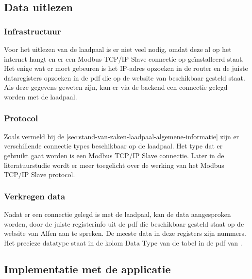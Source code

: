 \subsection{Data uitlezen}
\label{sec:stand-van-zaken-laadpaal-data-uitlezen}

\subsubsection{Infrastructuur}
\label{sec:stand-van-zaken-laadpaal-infrastructuur}

Voor het uitlezen van de laadpaal is er niet veel nodig, omdat deze al op het internet hangt en er een Modbus TCP/IP Slave connectie op geïnstalleerd staat. Het enige wat er moet gebeuren is het IP-adres opzoeken in de router en de juiste dataregisters opzoeken in de pdf die op de website van \textcite{Alfen2020} beschikbaar gesteld staat. Als deze gegevens geweten zijn, kan er via de backend een connectie gelegd worden met de laadpaal.

\subsubsection{Protocol}
\label{sec:stand-van-zaken-laadpaal-protocol}

Zoals vermeld bij de \ref{sec:stand-van-zaken-laadpaal-algemene-informatie} zijn er verschillende connectie types beschikbaar op de laadpaal. Het type dat er gebruikt gaat worden is een Modbus TCP/IP Slave connectie. Later in de literatuurstudie wordt er meer toegelicht over de werking van het Modbus TCP/IP Slave protocol.

\subsubsection{Verkregen data}
\label{sec:stand-van-zaken-laadpaal-verkregen-data}

Nadat er een connectie gelegd is met de laadpaal, kan de data aangesproken worden, door de juiste registerinfo uit de pdf die beschikbaar gesteld staat op de website van Alfen aan te spreken. De meeste data in deze registers zijn nummers. Het precieze datatype staat in de kolom Data Type van de tabel in de pdf van \textcite{Alfen2020}.

\subsection{Implementatie met de applicatie}
\label{sec:stand-van-zaken-laadpaal-implementatie}

